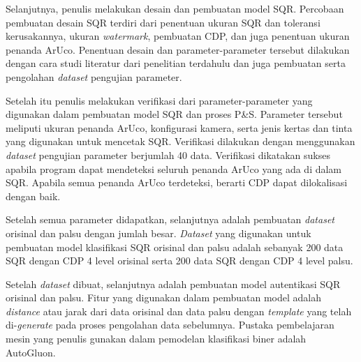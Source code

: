 Selanjutnya, penulis melakukan desain dan pembuatan model SQR. Percobaan pembuatan desain SQR terdiri dari penentuan ukuran SQR dan toleransi kerusakannya,
ukuran \emph{watermark}, pembuatan CDP, dan juga penentuan ukuran penanda ArUco. Penentuan desain dan parameter-parameter tersebut dilakukan dengan cara studi
literatur dari penelitian terdahulu dan juga pembuatan serta pengolahan \emph{dataset} pengujian parameter.

Setelah itu penulis melakukan verifikasi dari parameter-parameter yang digunakan dalam pembuatan model SQR dan proses P\&S. Parameter tersebut meliputi ukuran
penanda ArUco, konfigurasi kamera, serta jenis kertas dan tinta yang digunakan untuk mencetak SQR. Verifikasi dilakukan dengan menggunakan \emph{dataset}
pengujian parameter berjumlah 40 data. Verifikasi dikatakan sukses apabila program dapat mendeteksi seluruh penanda ArUco yang ada di dalam SQR. Apabila semua
penanda ArUco terdeteksi, berarti CDP dapat dilokalisasi dengan baik.

Setelah semua parameter didapatkan, selanjutnya adalah pembuatan \emph{dataset} orisinal dan palsu dengan jumlah besar. \emph{Dataset} yang digunakan untuk
pembuatan model klasifikasi SQR orisinal dan palsu adalah sebanyak 200 data SQR dengan CDP 4 level orisinal serta 200 data SQR dengan CDP 4 level palsu.


Setelah \emph{dataset} dibuat, selanjutnya adalah pembuatan model autentikasi SQR orisinal dan palsu. Fitur yang digunakan dalam pembuatan model adalah
\emph{distance} atau jarak dari data orisinal dan data palsu dengan \emph{template} yang telah di-\emph{generate} pada proses pengolahan data sebelumnya.
Pustaka pembelajaran mesin yang penulis gunakan dalam pemodelan klasifikasi biner adalah AutoGluon.

